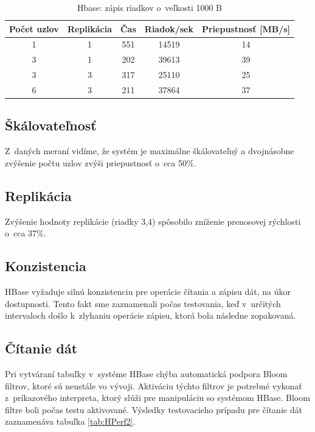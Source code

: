 \documentclass[11pt,twoside,a4paper]{book}
\begin{document}
\begin{table}[hp]
\begin{center}
\begin{tabular}{|c|c|c|c|c|}
\hline Počet uzlov & Replikácia  & Čas & Riadok/sek & Priepustnosť [MB/s]\\ 
\hline
\hline 1 & 1 &  551 & 14519 & 14\\ 
\hline 3 & 1 &  202 & 39613 & 39\\ 
\hline 3 & 3 &  317 & 25110 & 25\\ 
\hline 6 & 3 &  211 & 37864 & 37\\ 
\hline
\end{tabular} 
\end{center}
\caption{Hbase: zápis riadkov o~veľkosti 1000 B}
\label{tab:HPerf1}
\end{table}

\subsection*{Škálovateľnosť}

Z~daných meraní vidíme, že systém je maximálne škálovateľný a dvojnásobne zvýšenie počtu uzlov zvýši priepustnosť o~cca 50\%.

\subsection*{Replikácia}

Zvýšenie hodnoty replikácie (riadky 3,4) spôsobilo zníženie prenosovej rýchlosti o~cca 37\%.

\subsection*{Konzistencia}

HBase vyžaduje silnú konzistenciu pre operácie čítania a zápisu dát, na úkor dostupnosti. Tento fakt sme zaznamenali počas testovania, keď v~určitých intervaloch došlo k~zlyhaniu operácie zápisu, ktorá bola následne zopakovaná.

\subsection*{Čítanie dát}

Pri vytváraní tabuľky v~systéme HBase chýba automatická podpora Bloom filtrov, ktoré sú neustále vo vývoji. Aktiváciu týchto filtrov je potrebné vykonať z~príkazového interpreta, ktorý slúži pre manipuláciu so systémom HBase. Bloom filtre boli počas testu aktivované. Výsledky testovacieho prípadu pre čítanie dát zaznamenáva tabuľka \ref{tab:HPerf2}.
\end{document}

